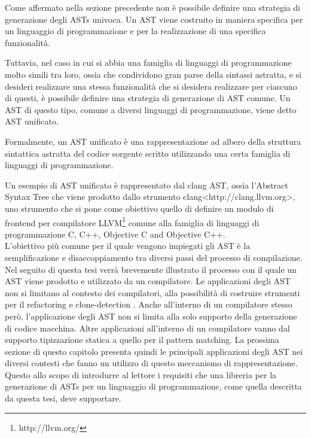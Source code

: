 Come affermato nella sezione precedente non è possibile definire una strategia
di generazione degli ASTs univoca. Un AST viene costruito in maniera specifica
per un linguaggio di programmazione e per la realizzazione di una specifica
funzionalità.

Tuttavia, nel caso in cui si abbia una famiglia di linguaggi di programmazione
molto simili tra loro, ossia che condividono gran parse della sintassi
astratta, e si desideri realizzare una stessa funzionalità che si desidera
realizzare per ciascuno di questi, è possibile definire una strategia di
generazione di AST comune. Un AST di questo tipo, comune a diversi linguaggi di
programmazione, viene detto AST unificato.

Formalmente, un AST unificato è una rappresentazione ad albero della struttura
sintattica astratta del codice sorgente scritto utilizzando una certa famiglia
di linguaggi di programmazione.

Un esempio di AST unificato è rappresentato dal clang AST, ossia l’Abstract
Syntax Tree che viene prodotto dallo strumento clang<http://clang.llvm.org>,
uno strumento che si pone come obiettivo quello di definire un modulo di
frontend per compilatore LLVM\footnote{http://llvm.org/} comune alla famiglia
di linguaggi di programmazione C, C++, Objective C and Objective C++.\\

L’obiettivo più comune per il quale vengono impiegati gli AST è la
semplificazione e disaccoppiamento tra diversi passi del processo di
compilazione. Nel seguito di questa tesi verrà brevemente illustrato il
processo con il quale un AST viene prodotto e utilizzato da un compilatore. Le
applicazioni degli AST non si limitano al contesto dei compilatori, alla
possibilità di costruire strumenti per il refactoring \cite{jscodeshift2016} e
clone-detection \cite{DBLP:conf/saci/LazarB14}. Anche all’interno di un
compilatore stesso però, l’applicazione degli AST non si limita alla solo
supporto della generazione di codice macchina. Altre applicazioni all’interno
di un compilatore vanno dal supporto tipizzazione statica a quello per il
pattern matching. La prossima sezione di questo capitolo presenta quindi le
principali applicazioni degli AST nei diversi contesti che fanno un utilizzo di
questo meccanismo di rappresentazione. Questo allo scopo di introdurre al
lettore i requisiti che una libreria per la generazione di ASTs per un
linguaggio di programmazione, come quella descritta da questa tesi, deve
supportare.\\

